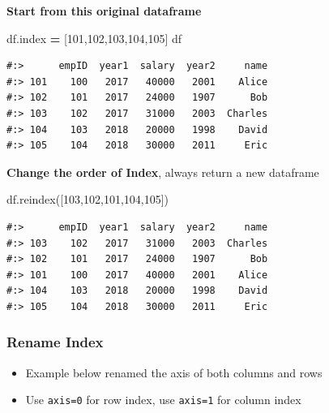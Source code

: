 \documentclass[
]{book}
\newenvironment{Shaded}{\begin{snugshade}}{\end{snugshade}}
\newcommand{\DecValTok}[1]{\textcolor[rgb]{0.06,0.06,0.06}{#1}}
\newcommand{\NormalTok}[1]{#1}
\newcommand{\OperatorTok}[1]{\textcolor[rgb]{0.43,0.43,0.43}{\textbf{#1}}}
\providecommand{\tightlist}{%
  \setlength{\itemsep}{0pt}\setlength{\parskip}{0pt}}
\begin{document}
\textbf{Start from this original dataframe}

\begin{Shaded}
\begin{Highlighting}[]
\NormalTok{df.index }\OperatorTok{=}\NormalTok{ [}\DecValTok{101}\NormalTok{,}\DecValTok{102}\NormalTok{,}\DecValTok{103}\NormalTok{,}\DecValTok{104}\NormalTok{,}\DecValTok{105}\NormalTok{]}
\NormalTok{df}
\end{Highlighting}
\end{Shaded}

\begin{verbatim}
#:>      empID  year1  salary  year2     name
#:> 101    100   2017   40000   2001    Alice
#:> 102    101   2017   24000   1907      Bob
#:> 103    102   2017   31000   2003  Charles
#:> 104    103   2018   20000   1998    David
#:> 105    104   2018   30000   2011     Eric
\end{verbatim}

\textbf{Change the order of Index}, always return a new dataframe

\begin{Shaded}
\begin{Highlighting}[]
\NormalTok{df.reindex([}\DecValTok{103}\NormalTok{,}\DecValTok{102}\NormalTok{,}\DecValTok{101}\NormalTok{,}\DecValTok{104}\NormalTok{,}\DecValTok{105}\NormalTok{])}
\end{Highlighting}
\end{Shaded}

\begin{verbatim}
#:>      empID  year1  salary  year2     name
#:> 103    102   2017   31000   2003  Charles
#:> 102    101   2017   24000   1907      Bob
#:> 101    100   2017   40000   2001    Alice
#:> 104    103   2018   20000   1998    David
#:> 105    104   2018   30000   2011     Eric
\end{verbatim}

\hypertarget{rename-index}{%
\subsubsection{Rename Index}\label{rename-index}}

\begin{itemize}
\tightlist
\item
  Example below renamed the axis of both columns and rows\\
\item
  Use \texttt{axis=0} for row index, use \texttt{axis=1} for column index
\end{itemize}
\end{document}
